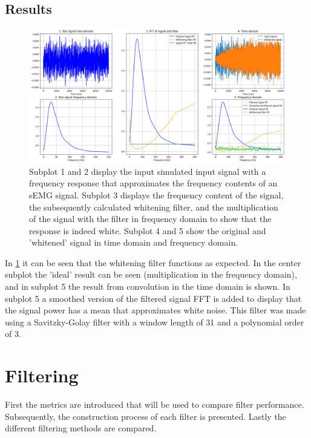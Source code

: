 \subsection{Results}
\begin{figure}[h!t]
	\begin{center}
		\includegraphics[width=1.0\columnwidth]{images/prewhitening_simulation.png}
	\end{center}
	\caption{Subplot 1 and 2 display the input simulated input signal with a frequency response that approximates the frequency contents of an sEMG signal. Subplot 3 displays the frequency content of the signal, the subsequently calculated whitening filter, and the multiplication of the signal with the filter in frequency domain to show that the response is indeed white. Subplot 4 and 5 show the original and 'whitened' signal in time domain and frequency domain.}
	\label{fig:whitening_simulation}
\end{figure}

In \ref{fig:whitening_simulation} it can be seen that the whitening filter functions as expected. In the center subplot the 'ideal' result can be seen (multiplication in the frequency domain), and in subplot 5 the result from convolution in the time domain is shown. In subplot 5 a smoothed version of the filtered signal FFT is added to display that the signal power has a mean that approximates white noise. This filter was made using a Savitzky-Golay filter with a window length of 31 and a polynomial order of 3.

\section{Filtering}
First the metrics are introduced that will be used to compare filter performance. Subsequently, the construction process of each filter is presented. Lastly the different filtering methods are compared.

